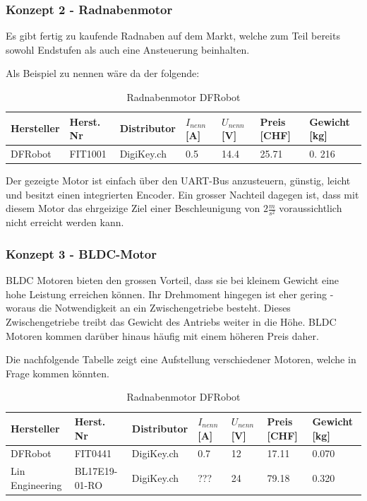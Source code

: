 \documentclass[main.tex]{subfiles} %
\begin{document}
\subsubsection*{Konzept 2 - Radnabenmotor} %

Es gibt fertig zu kaufende Radnaben auf dem Markt, welche zum Teil bereits
sowohl Endstufen als auch eine Ansteuerung beinhalten.

Als Beispiel zu nennen wäre da der folgende:

\begin{table}[h]
    \centering
    \begin{tabular}{|p{2cm}|p{3cm}|p{2cm}|p{1cm}|p{1cm}|p{1cm}|p{1.5cm}|}
        \hline
        Hersteller & Herst. Nr & Distributor & $I_{nenn} $ [A] & $U_{nenn}$ [V] & Preis [CHF] & Gewicht [kg] \\ \hline
        DFRobot    & FIT1001   & DigiKey.ch  & 0.5             & 14.4           & 25.71       & 0. 216       \\ \hline
    \end{tabular}
    \caption{Radnabenmotor DFRobot}
\end{table}

Der gezeigte Motor ist einfach über den UART-Bus anzusteuern, günstig, leicht
und besitzt einen integrierten Encoder. Ein grosser Nachteil dagegen ist, dass
mit diesem Motor das ehrgeizige Ziel einer Beschleunigung von $2 \frac{m}{s^2}$
voraussichtlich nicht erreicht werden kann.

\subsubsection*{Konzept 3 - BLDC-Motor} %

BLDC Motoren bieten den grossen Vorteil, dass sie bei kleinem Gewicht eine hohe
Leistung erreichen können. Ihr Drehmoment hingegen ist eher gering - woraus die
Notwendigkeit an ein Zwischengetriebe besteht. Dieses Zwischengetriebe treibt
das Gewicht des Antriebs weiter in die Höhe. BLDC Motoren kommen darüber hinaus
häufig mit einem höheren Preis daher.

Die nachfolgende Tabelle zeigt eine Aufstellung verschiedener Motoren, welche
in Frage kommen könnten.


\begin{table}[h]
    \centering
    \begin{tabular}{|p{2cm}|p{3cm}|p{2cm}|p{1cm}|p{1cm}|p{1cm}|p{1.5cm}|}
        \hline
        Hersteller      & Herst. Nr     & Distributor & $I_{nenn} $ [A] & $U_{nenn}$ [V] & Preis [CHF] & Gewicht [kg] \\ \hline
        DFRobot         & FIT0441       & DigiKey.ch  & 0.7             & 12             & 17.11       & 0.070        \\ \hline
        Lin Engineering & BL17E19-01-RO & DigiKey.ch  & ???             & 24             & 79.18       & 0.320        \\ \hline
    \end{tabular}
    \caption{Radnabenmotor DFRobot}
\end{table}
\end{document}
